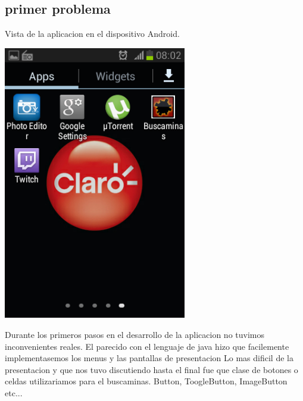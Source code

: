 \documentclass[11pt]{article} %
\begin{document}
\subsection{primer problema}
\begin{center}
Vista de la aplicacion en el dispositivo Android. 

\includegraphics[width=8cm]{imagenes/Screenshot_2013-12-11-08-02-11.png}
\end{center}

Durante los primeros pasos en el desarrollo de la aplicacion no tuvimos inconvenientes reales. El parecido con el lenguaje de java hizo que facilemente implementasemos los menus y las pantallas de presentacion
Lo mas dificil de la presentacion y que nos tuvo discutiendo hasta el final fue que clase de botones o celdas utilizariamos para el buscaminas. Button, ToogleButton, ImageButton etc...
\end{document}
